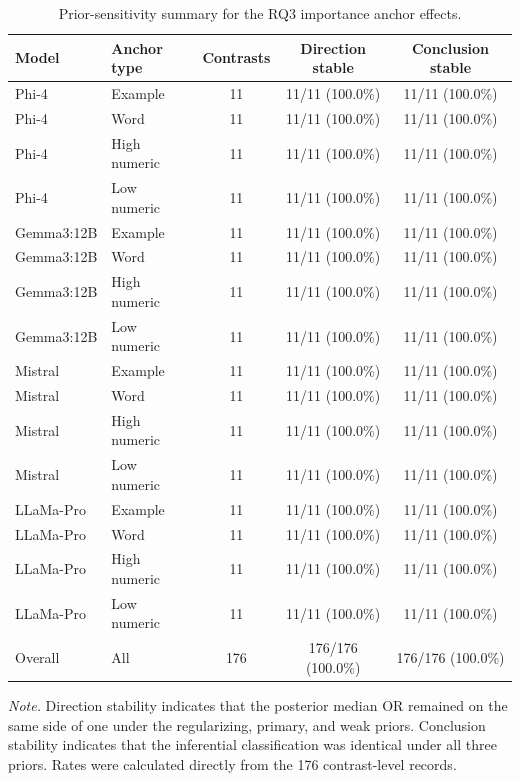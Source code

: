 \begin{table}[tbp]
\caption{Prior-sensitivity summary for the RQ3 importance anchor effects.}
\label{tab:rq3_importance_prior_sensitivity}
\begin{tabular}{llccc}
\toprule
Model & Anchor type & Contrasts & Direction stable & Conclusion stable \\
\midrule
Phi-4 & Example & 11 & 11/11 (100.0\%) & 11/11 (100.0\%) \\
Phi-4 & Word & 11 & 11/11 (100.0\%) & 11/11 (100.0\%) \\
Phi-4 & High numeric & 11 & 11/11 (100.0\%) & 11/11 (100.0\%) \\
Phi-4 & Low numeric & 11 & 11/11 (100.0\%) & 11/11 (100.0\%) \\
Gemma3:12B & Example & 11 & 11/11 (100.0\%) & 11/11 (100.0\%) \\
Gemma3:12B & Word & 11 & 11/11 (100.0\%) & 11/11 (100.0\%) \\
Gemma3:12B & High numeric & 11 & 11/11 (100.0\%) & 11/11 (100.0\%) \\
Gemma3:12B & Low numeric & 11 & 11/11 (100.0\%) & 11/11 (100.0\%) \\
Mistral & Example & 11 & 11/11 (100.0\%) & 11/11 (100.0\%) \\
Mistral & Word & 11 & 11/11 (100.0\%) & 11/11 (100.0\%) \\
Mistral & High numeric & 11 & 11/11 (100.0\%) & 11/11 (100.0\%) \\
Mistral & Low numeric & 11 & 11/11 (100.0\%) & 11/11 (100.0\%) \\
LLaMa-Pro & Example & 11 & 11/11 (100.0\%) & 11/11 (100.0\%) \\
LLaMa-Pro & Word & 11 & 11/11 (100.0\%) & 11/11 (100.0\%) \\
LLaMa-Pro & High numeric & 11 & 11/11 (100.0\%) & 11/11 (100.0\%) \\
LLaMa-Pro & Low numeric & 11 & 11/11 (100.0\%) & 11/11 (100.0\%) \\
Overall & All & 176 & 176/176 (100.0\%) & 176/176 (100.0\%) \\
\bottomrule
\end{tabular}

\noindent\begin{minipage}{\linewidth}
\footnotesize\textit{Note.} Direction stability indicates that the posterior median OR remained on the same side of one under the regularizing, primary, and weak priors. Conclusion stability indicates that the inferential classification was identical under all three priors. Rates were calculated directly from the 176 contrast-level records.
\end{minipage}

\end{table}
